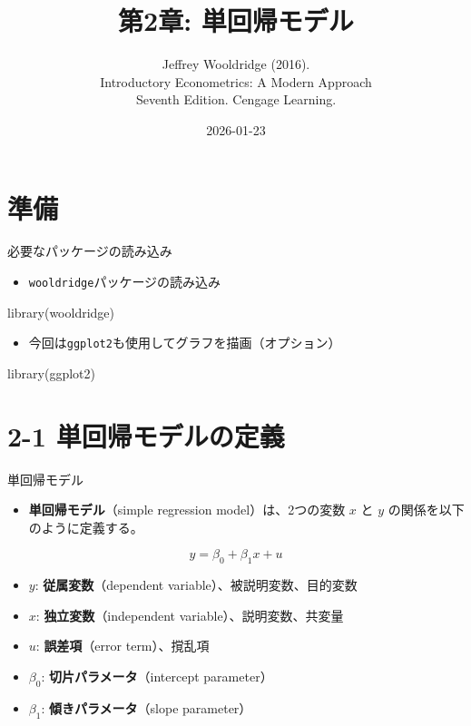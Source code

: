 \documentclass[
  ignorenonframetext,
]{beamer}
\title{第2章: 単回帰モデル}
\subtitle{Jeffrey Wooldridge (2016).\\
Introductory Econometrics: A Modern Approach\\
Seventh Edition. Cengage Learning.}
\author{}
\date{\vspace{-2.5em}2026-01-23}
\newenvironment{Shaded}{\begin{snugshade}}{\end{snugshade}}
\newcommand{\FunctionTok}[1]{\textcolor[rgb]{0.00,0.00,0.00}{#1}}
\newcommand{\NormalTok}[1]{#1}
\providecommand{\tightlist}{%
  \setlength{\itemsep}{0pt}\setlength{\parskip}{0pt}}
\begin{document}
\frame{\titlepage}

\hypertarget{ux6e96ux5099}{%
\section{準備}\label{ux6e96ux5099}}

\begin{frame}[fragile]{必要なパッケージの読み込み}
\protect\hypertarget{ux5fc5ux8981ux306aux30d1ux30c3ux30b1ux30fcux30b8ux306eux8aadux307fux8fbcux307f}{}
\begin{itemize}
\tightlist
\item
  \texttt{wooldridge}パッケージの読み込み
\end{itemize}

\begin{Shaded}
\begin{Highlighting}[]
\FunctionTok{library}\NormalTok{(wooldridge)}
\end{Highlighting}
\end{Shaded}

\begin{itemize}
\tightlist
\item
  今回は\texttt{ggplot2}も使用してグラフを描画（オプション）
\end{itemize}

\begin{Shaded}
\begin{Highlighting}[]
\FunctionTok{library}\NormalTok{(ggplot2)}
\end{Highlighting}
\end{Shaded}
\end{frame}

\hypertarget{ux5358ux56deux5e30ux30e2ux30c7ux30ebux306eux5b9aux7fa9}{%
\section{2-1
単回帰モデルの定義}\label{ux5358ux56deux5e30ux30e2ux30c7ux30ebux306eux5b9aux7fa9}}

\begin{frame}{単回帰モデル}
\protect\hypertarget{ux5358ux56deux5e30ux30e2ux30c7ux30eb}{}
\begin{itemize}
\tightlist
\item
  \textbf{単回帰モデル}（simple regression model）は、2つの変数 \(x\) と
  \(y\) の関係を以下のように定義する。
\end{itemize}

\[ y = \beta_0 + \beta_1 x + u \]

\begin{itemize}
\tightlist
\item
  \(y\): \textbf{従属変数}（dependent variable）、被説明変数、目的変数
\item
  \(x\): \textbf{独立変数}（independent variable）、説明変数、共変量
\item
  \(u\): \textbf{誤差項}（error term）、撹乱項
\item
  \(\beta_0\): \textbf{切片パラメータ}（intercept parameter）
\item
  \(\beta_1\): \textbf{傾きパラメータ}（slope parameter）
\end{itemize}
\end{frame}
\end{document}
